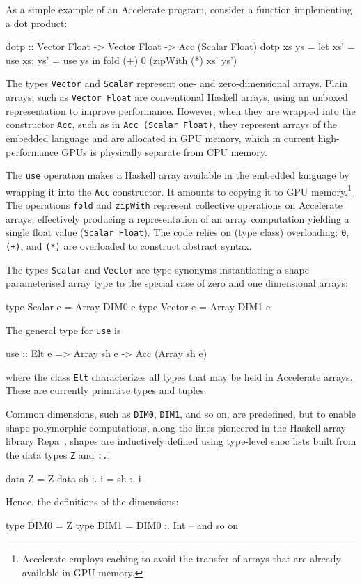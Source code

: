 \documentclass{llncs}
\begin{document}
As a simple example of an Accelerate program, consider a function implementing a dot product:
%
\begin{hcode}
dotp :: Vector Float -> Vector Float -> Acc (Scalar Float)
dotp xs ys = let { xs' = use xs; ys' = use ys }
             in  fold (+) 0 (zipWith (*) xs' ys')
\end{hcode}
%
The types \verb+Vector+ and \verb+Scalar+ represent one- and zero-dimensional
arrays. Plain arrays, such as \verb+Vector Float+ are conventional Haskell arrays, using an unboxed representation to improve performance. However, when they are wrapped into the constructor \verb+Acc+, such as in \verb+Acc (Scalar Float)+, they represent arrays of the embedded language and are allocated in GPU memory, which in current high-performance GPUs is physically separate from CPU memory.

The \verb+use+ operation makes a Haskell array available in the
embedded language by wrapping it into the \verb+Acc+ constructor. It
amounts to copying it to GPU memory.\footnote{Accelerate employs
  caching to avoid the transfer of arrays that are already
  available in GPU memory.} The operations \texttt{fold} and
\texttt{zipWith} represent collective operations on Accelerate arrays,
effectively producing a representation of an array computation
yielding  a single float value (\texttt{Scalar Float}). The code relies on (type class) overloading: \texttt{0}, \texttt{(+)}, and
\texttt{(*)} are overloaded to construct abstract syntax. 

The types \verb+Scalar+ and \verb+Vector+ are type synonyms instantiating a shape-parameterised array type to the special case of zero and one dimensional arrays:
%
\begin{hcode}
type Scalar e = Array DIM0 e
type Vector e = Array DIM1 e
\end{hcode}

The general type for \verb+use+ is
%
\begin{hcode}
use :: Elt e => Array sh e -> Acc (Array sh e)
\end{hcode}
%
where the class \verb+Elt+ characterizes all types that may be held in Accelerate arrays. These are currently primitive types and tuples.

Common dimensions, such as \verb+DIM0+, \verb+DIM1+, and so on, are
predefined, but to enable shape polymorphic computations, along the
lines pioneered in the Haskell array library
Repa~\cite{keller-etal:repa}, shapes are inductively defined using
type-level snoc lists built from the data types \texttt{Z} and \texttt{:.}:
%
\begin{hcode}
data Z       = Z
data sh :. i = sh :. i
\end{hcode}
%
Hence, the definitions of the dimensions:
%
\begin{hcode}
type DIM0 = Z
type DIM1 = DIM0 :. Int
-- and so on
\end{hcode}
\end{document}

